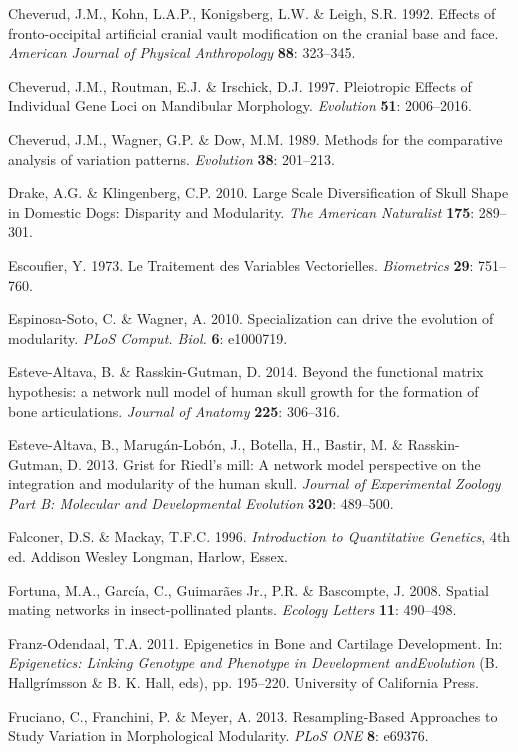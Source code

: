 \documentclass[12pt,]{article}
\begin{document}
Cheverud, J.M., Kohn, L.A.P., Konigsberg, L.W. \& Leigh, S.R. 1992.
Effects of fronto-occipital artificial cranial vault modification on the
cranial base and face. \emph{American Journal of Physical Anthropology}
\textbf{88}: 323--345.

Cheverud, J.M., Routman, E.J. \& Irschick, D.J. 1997. Pleiotropic
Effects of Individual Gene Loci on Mandibular Morphology.
\emph{Evolution} \textbf{51}: 2006--2016.

Cheverud, J.M., Wagner, G.P. \& Dow, M.M. 1989. Methods for the
comparative analysis of variation patterns. \emph{Evolution}
\textbf{38}: 201--213.

Drake, A.G. \& Klingenberg, C.P. 2010. Large Scale Diversification of
Skull Shape in Domestic Dogs: Disparity and Modularity. \emph{The
American Naturalist} \textbf{175}: 289--301.

Escoufier, Y. 1973. Le Traitement des Variables Vectorielles.
\emph{Biometrics} \textbf{29}: 751--760.

Espinosa-Soto, C. \& Wagner, A. 2010. Specialization can drive the
evolution of modularity. \emph{PLoS Comput. Biol.} \textbf{6}: e1000719.

Esteve-Altava, B. \& Rasskin-Gutman, D. 2014. Beyond the functional
matrix hypothesis: a network null model of human skull growth for the
formation of bone articulations. \emph{Journal of Anatomy} \textbf{225}:
306--316.

Esteve-Altava, B., Marugán-Lobón, J., Botella, H., Bastir, M. \&
Rasskin-Gutman, D. 2013. Grist for Riedl's mill: A network model
perspective on the integration and modularity of the human skull.
\emph{Journal of Experimental Zoology Part B: Molecular and
Developmental Evolution} \textbf{320}: 489--500.

Falconer, D.S. \& Mackay, T.F.C. 1996. \emph{Introduction to
Quantitative Genetics}, 4th ed. Addison Wesley Longman, Harlow, Essex.

Fortuna, M.A., García, C., Guimarães Jr., P.R. \& Bascompte, J. 2008.
Spatial mating networks in insect-pollinated plants. \emph{Ecology
Letters} \textbf{11}: 490--498.

Franz-Odendaal, T.A. 2011. Epigenetics in Bone and Cartilage
Development. In: \emph{Epigenetics: Linking Genotype and Phenotype in
Development andEvolution} (B. Hallgrímsson \& B. K. Hall, eds), pp.
195--220. University of California Press.

Fruciano, C., Franchini, P. \& Meyer, A. 2013. Resampling-Based
Approaches to Study Variation in Morphological Modularity. \emph{PLoS
ONE} \textbf{8}: e69376.
\end{document}
